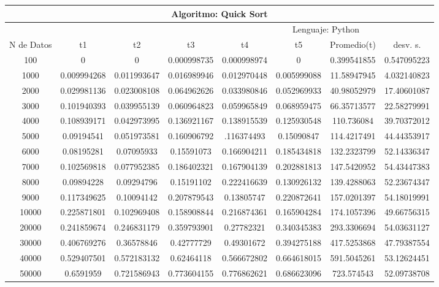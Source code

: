 \documentclass{article}
\begin{document}
            \begin{table}[]
        \begin{tabular}{|c|c|c|c|c|c|c|c| }
            \hline
            \multicolumn{8}{|c|}{Algoritmo: Quick Sort} \\ \hline
            \multicolumn{4}{|c|}{} & \multicolumn{4}{c|}{Lenguaje: Python} \\ \hline
              N de Datos &     t1    &  t2         &  t3          &   t4        &    t5     &   Promedio(t)       & desv. s. \\ \hline
100	&0	&0	&0.000998735&	0.000998974&	0	&0.399541855	&0.547095223\\ \hline
1000	&0.009994268	&0.011993647	&0.016989946	&0.012970448&	0.005999088	&11.58947945	&4.032140823\\ \hline
2000	&0.029981136	&0.023008108	&0.064962626	&0.033980846	&0.052969933	&40.98052979	&17.40601087\\ \hline
3000	&0.101940393	&0.039955139	&0.060964823	&0.059965849	&0.068959475	&66.35713577	&22.58279991\\ \hline
4000	&0.108939171	&0.042973995	&0.136921167	&0.138915539	&0.125930548	&110.736084	&39.70372012\\ \hline
5000	&0.09194541	&0.051973581	&0.160906792	&.116374493	&0.15090847	&114.4217491	&44.44353917\\ \hline
6000	&0.08195281	&0.07095933	&0.15591073	&0.166904211	&0.185434818	&132.2323799	&52.14336347\\ \hline
7000	&0.102569818	&0.077952385	&0.186402321	&0.167904139	&0.202881813	&147.5420952	&54.43447383\\ \hline
8000	&0.09894228	&0.09294796	&0.15191102	&0.222416639	&0.130926132	&139.4288063	&52.23674347\\ \hline
9000	&0.117349625	&0.10094142	&0.207879543	&0.13805747	&0.220872641	&157.0201397	&54.18019991\\ \hline
10000	&0.225871801	&0.102969408	&0.158908844	&0.216874361	&0.165904284	&174.1057396	&49.66756315\\ \hline
20000	&0.241859674	&0.246831179	&0.359793901	&0.27782321	&0.340345383	&293.3306694	&54.03631127\\ \hline
30000	&0.406769276	&0.36578846	&0.42777729	&0.49301672	&0.394275188	&417.5253868	&47.79387554\\ \hline
40000	&0.529407501	&0.572183132	&0.62464118	&0.566672802	&0.664618015	&591.5045261	&53.12624451\\ \hline
50000	&0.6591959	&0.721586943	&0.773604155	&0.776862621	&0.686623096	&723.574543	&52.09738708\\ \hline

\end{tabular}
\end{table}
\end{document}
